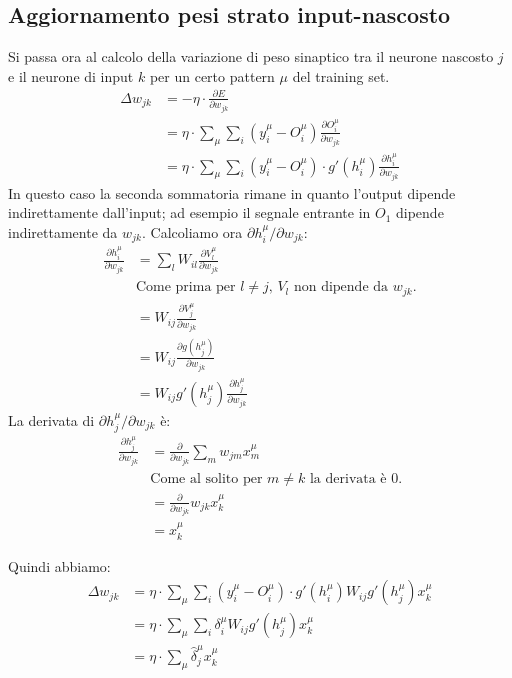 \subsection{Aggiornamento pesi strato input-nascosto} %
\label{sub:aggiornamento_pesi_strato_input_nascosto}
Si passa ora al calcolo della variazione di peso sinaptico tra il neurone nascosto $j$ e il neurone di input $k$ per un certo pattern $\mu$ del training set.
\begin{align*}
    \Delta w_{jk} &= - \eta \cdot \frac{\partial E}{\partial w_{jk}} \\
    &= \eta \cdot \sum_\mu \sum_i (y^\mu_i - O^\mu_i)  \frac{\partial O^\mu_i}{\partial w_{jk}} \\
    &= \eta \cdot \sum_\mu \sum_i (y^\mu_i - O^\mu_i) \cdot   g'(h^\mu_i) \frac{\partial h^\mu_i}{\partial w_{jk}}
\end{align*}
In questo caso la seconda sommatoria rimane in quanto l'output dipende indirettamente dall'input; ad esempio il segnale entrante in $O_1$ dipende indirettamente da $w_{jk}$.
Calcoliamo ora $\partial h^\mu_i / \partial w_{jk}$:
\begin{align*}
    \frac{\partial h^\mu_i}{\partial w_{jk}} &= \sum_l W_{il} \frac{\partial V_l^\mu}{\partial w_{jk}} \\
    &\text{Come prima per $l\neq j$, $V_l$ non dipende da $w_{jk}$.} \\
    &= W_{ij} \frac{\partial V_j^\mu}{\partial w_{jk}} \\
    &= W_{ij} \frac{\partial g(h^\mu_j)}{\partial w_{jk}} \\
    &= W_{ij} g'(h^\mu_j) \frac{\partial h^\mu_j}{\partial w_{jk}}
\end{align*}
La derivata di $\partial h^\mu_j / \partial w_{jk}$ è:
\begin{align*}
	\frac{\partial h^\mu_j}{\partial w_{jk}} 
	&= \frac{\partial}{\partial w_{jk}} \sum_m w_{jm} x^\mu_m \\
	&\text{Come al solito per $m \neq k$ la derivata è 0.} \\
	&= \frac{\partial}{\partial w_{jk}} w_{jk} x^\mu_k\\
	&= x^\mu_k
\end{align*}

\newpage

Quindi abbiamo:
\begin{align*}
    \Delta w_{jk} &= \eta \cdot \sum_\mu \sum_i (y_i^\mu - O^\mu_i) \cdot g'(h^\mu_i) W_{ij} g'(h_j^\mu) x^\mu_k\\
    &= \eta \cdot \sum_\mu \sum_i \delta_i^\mu W_{ij} g'(h_j^\mu) x^\mu_k \\
    &= \eta \cdot \sum_\mu \hat{\delta}_j^\mu x^\mu_k
\end{align*}

